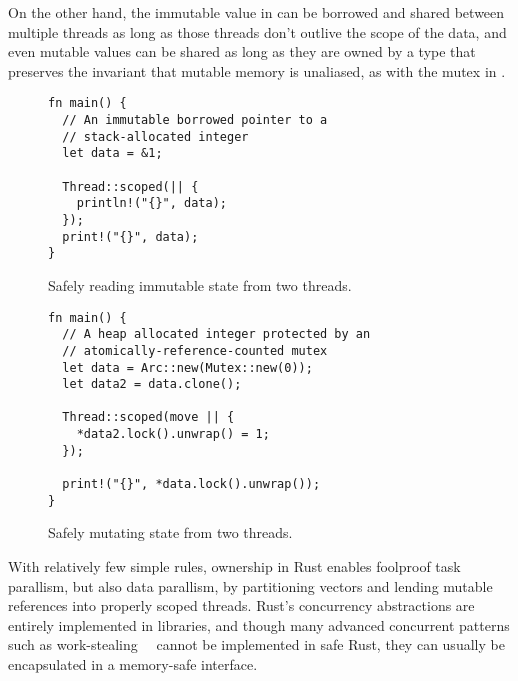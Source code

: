 On the other hand, the immutable value in  can be borrowed and shared between multiple threads as long as those threads don't outlive the scope of the data, and even mutable values can be shared as long
as they are owned by a type that preserves the invariant that mutable memory is unaliased, as with the
mutex in .

\begin{figure}
\begin{lstlisting}
fn main() {
  // An immutable borrowed pointer to a
  // stack-allocated integer
  let data = &1;

  Thread::scoped(|| {
    println!("{}", data);
  });
  print!("{}", data);
}
\end{lstlisting}
  \caption{Safely reading immutable state from two threads.}
  \label{fig:shared-concurrency}
\end{figure}

\begin{figure}
\begin{lstlisting}
fn main() {
  // A heap allocated integer protected by an
  // atomically-reference-counted mutex
  let data = Arc::new(Mutex::new(0));
  let data2 = data.clone();

  Thread::scoped(move || {
    *data2.lock().unwrap() = 1;
  });

  print!("{}", *data.lock().unwrap());
}
\end{lstlisting}
  \caption{Safely mutating state from two threads.}
  \label{fig:shared-mutable-concurrency}
\end{figure}

With relatively few simple rules, ownership in Rust enables foolproof task parallism,
but also data parallism, by partitioning vectors and lending mutable references into properly scoped threads.
Rust's concurrency abstractions are entirely implemented in libraries, and though
many advanced concurrent patterns such as work-stealing~~\cite{blumeofe:multiprogrammed-work-stealing}
cannot be implemented in safe Rust, they can usually be encapsulated in a memory-safe interface.

